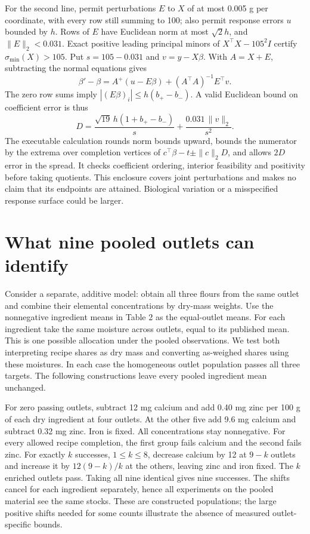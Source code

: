 \documentclass[11pt]{article}
\begin{document}
For the second line, permit perturbations $E$ to $X$ of at most 0.005 g per coordinate, with every row still summing to 100; also permit response errors $u$ bounded by $h$. Rows of $E$ have Euclidean norm at most $\sqrt2 h$, and $\|E\|_2<0.031$. Exact positive leading principal minors of $X^\top X-105^2I$ certify $\sigma_{\min}(X)>105$. Put $s=105-0.031$ and $v=y-X\beta$. With $A=X+E$, subtracting the normal equations gives
\[
 \beta'-\beta=A^+(u-E\beta)+(A^\top A)^{-1}E^\top v .
\]
The zero row sums imply $|(E\beta)_i|\le h(b_+-b_-)$. A valid Euclidean bound on coefficient error is thus
\[
 D=\frac{\sqrt{19}\,h(1+b_+-b_-)}{s}
       +\frac{0.031\,\|v\|_2}{s^2}.
\]
The executable calculation rounds norm bounds upward, bounds the numerator by the extrema over completion vertices of $c^\top\beta-t\pm\|c\|_2D$, and allows $2D$ error in the spread. It checks coefficient ordering, interior feasibility and positivity before taking quotients. This enclosure covers joint perturbations and makes no claim that its endpoints are attained. Biological variation or a misspecified response surface could be larger.

\section{What nine pooled outlets can identify}
Consider a separate, additive model: obtain all three flours from the same outlet and combine their elemental concentrations by dry-mass weights. Use the nonnegative ingredient means in Table 2 as the equal-outlet means. For each ingredient take the same moisture across outlets, equal to its published mean. This is one possible allocation under the pooled observations. We test both interpreting recipe shares as dry mass and converting as-weighed shares using these moistures. In each case the homogeneous outlet population passes all three targets. The following constructions leave every pooled ingredient mean unchanged.

For zero passing outlets, subtract 12 mg calcium and add 0.40 mg zinc per 100 g of each dry ingredient at four outlets. At the other five add 9.6 mg calcium and subtract 0.32 mg zinc. Iron is fixed. All concentrations stay nonnegative. For every allowed recipe completion, the first group fails calcium and the second fails zinc. For exactly $k$ successes, $1\le k\le8$, decrease calcium by 12 at $9-k$ outlets and increase it by $12(9-k)/k$ at the others, leaving zinc and iron fixed. The $k$ enriched outlets pass. Taking all nine identical gives nine successes. The shifts cancel for each ingredient separately, hence all experiments on the pooled material see the same stocks. These are constructed populations; the large positive shifts needed for some counts illustrate the absence of measured outlet-specific bounds.
\end{document}
